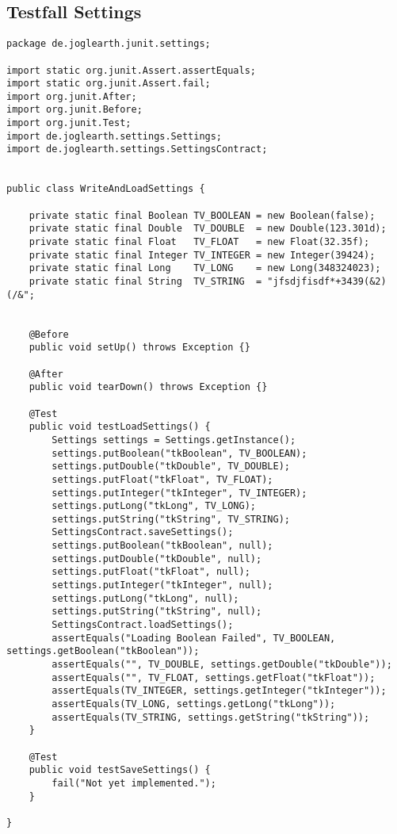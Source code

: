 \documentclass[10pt]{scrreprt}
\begin{document}
\subsection*{Testfall Settings}
\lstset{language=Java}
\begin{lstlisting}
package de.joglearth.junit.settings;

import static org.junit.Assert.assertEquals;
import static org.junit.Assert.fail;
import org.junit.After;
import org.junit.Before;
import org.junit.Test;
import de.joglearth.settings.Settings;
import de.joglearth.settings.SettingsContract;


public class WriteAndLoadSettings {

    private static final Boolean TV_BOOLEAN = new Boolean(false);
    private static final Double  TV_DOUBLE  = new Double(123.301d);
    private static final Float   TV_FLOAT   = new Float(32.35f);
    private static final Integer TV_INTEGER = new Integer(39424);
    private static final Long    TV_LONG    = new Long(348324023);
    private static final String  TV_STRING  = "jfsdjfisdf*+3439(&2)(/&";


    @Before
    public void setUp() throws Exception {}

    @After 
    public void tearDown() throws Exception {}

    @Test
    public void testLoadSettings() {
        Settings settings = Settings.getInstance();
        settings.putBoolean("tkBoolean", TV_BOOLEAN);
        settings.putDouble("tkDouble", TV_DOUBLE);
        settings.putFloat("tkFloat", TV_FLOAT);
        settings.putInteger("tkInteger", TV_INTEGER);
        settings.putLong("tkLong", TV_LONG);
        settings.putString("tkString", TV_STRING);
        SettingsContract.saveSettings();
        settings.putBoolean("tkBoolean", null);
        settings.putDouble("tkDouble", null);
        settings.putFloat("tkFloat", null);
        settings.putInteger("tkInteger", null);
        settings.putLong("tkLong", null);
        settings.putString("tkString", null);
        SettingsContract.loadSettings();
        assertEquals("Loading Boolean Failed", TV_BOOLEAN, settings.getBoolean("tkBoolean"));
        assertEquals("", TV_DOUBLE, settings.getDouble("tkDouble"));
        assertEquals("", TV_FLOAT, settings.getFloat("tkFloat"));
        assertEquals(TV_INTEGER, settings.getInteger("tkInteger"));
        assertEquals(TV_LONG, settings.getLong("tkLong"));
        assertEquals(TV_STRING, settings.getString("tkString"));
    }

    @Test
    public void testSaveSettings() {
        fail("Not yet implemented.");
    }

}

\end{lstlisting}
\end{document}

